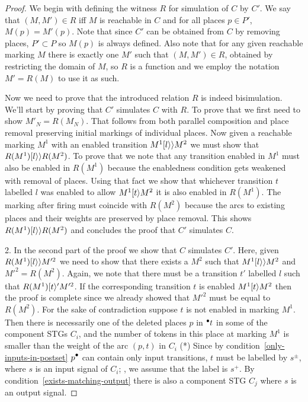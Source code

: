 \begin{proof}
We begin with defining the witness $R$ for simulation of $C$ by $C'$.
We say that $(M,M') \in R$ iff $M$ is reachable in $C$ and 
for all places $p \in P'$, $M(p)=M'(p)$.
Note that since $C'$ can be obtained from $C$ by removing places, $P' \subset P$ so $M(p)$ is always defined.
Also note that for any given reachable marking $M$ there is exactly one $M'$ such that $(M,M') \in R$, obtained by 
restricting the domain of $M$, so $R$ is a function and we employ the notation $M' = R(M)$ to use it as such.

Now we need to prove that the introduced relation $R$ is indeed bisimulation. 
We'll start by proving that $C'$ simulates $C$ with $R$.
To prove that we first need to show $M'_N = R(M_N)$. That follows from both parallel composition and place removal preserving initial markings of individual places.
Now given a reachable marking $M^1$ with an enabled transition $M^1 [l\rangle\rangle M^2$ we must show that $R(M^1) [l\rangle\rangle R(M^2)$. To prove that we note that any transition enabled in $M^1$ must also be enabled in $R(M^1)$ because the enabledness condition gets weakened with removal of places. Using that fact we show that whichever transition $t$ labelled $l$ was enabled to allow $M^1 [t\rangle M^2$ it is also enabled in $R(M^1)$. The marking after firing must coincide with $R(M^2)$ because the arcs to existing places and their weights are preserved by place removal. This shows $R(M^1) [l\rangle\rangle R(M^2)$ and concludes the proof that $C'$ simulates $C$.

2. In the second part of the proof we show that $C$ simulates $C'$. Here, given $R(M^1) [l\rangle\rangle M'^2$ we need to show that there exists a $M^2$ such that $M^1 [l\rangle\rangle M^2$ and $M'^2 = R(M^2)$. Again, we note that there must be a transition $t'$ labelled $l$ such that $R(M^1) [t\rangle' M'^2$. If the corresponding transition $t$ is enabled $M^1 [t\rangle M^2$ then the proof is complete since we already showed that $M'^2$ must be equal to $R(M^2)$. For the sake of contradiction suppose $t$ is not enabled in marking $M^1$. Then there is necessarily one of the deleted places $p$ in ${}^\bullet {t}$ in some of the component STGs $C_i$, and the number of tokens in this place at marking $M^1$ is
smaller than the weight of the arc $(p,t)$ in $C_i$ (*)
Since by condition~\ref{only-inputs-in-postset} $\post{p}$ can
contain only input transitions, $t$ must be labelled by
$s^\pm$, where $s$ is an input signal of $C_i$; \wlogg, we
assume that the label is $s^+$. By
condition~\ref{exists-matching-output} there is also a
component STG $C_j$ where $s$ is an output signal.


\end{proof}
